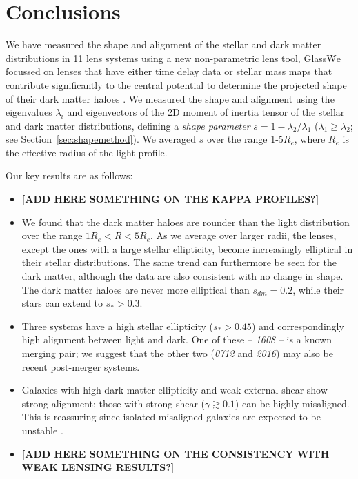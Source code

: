 \documentclass[useAMS,usenatbib]{mn2e}
\def\Glass{{\sc Glass}}
\begin{document}
\section{Conclusions}\label{sec:conclusions}
We have measured the shape and alignment of the stellar and dark matter distributions in 11 lens systems using a new non-parametric lens tool, \Glass\. We focussed on lenses that have either time delay data or stellar mass maps that contribute significantly to the central potential to determine the projected shape of their dark matter haloes \citep{2014MNRAS.445.2181C}. We measured the shape and alignment using the eigenvalues $\lambda_i$ and eigenvectors of the 2D moment of inertia tensor of the stellar and dark matter distributions, defining a {\it shape parameter} $s = 1 - \lambda_{2}/\lambda_{1}$ ($\lambda_{1} \geq \lambda_{2}$; see Section~\ref{sec:shapemethod}). We averaged $s$ over the range 1-5$R_e$, where $R_e$ is the effective radius of the light profile.

Our key results are as follows:

\begin{itemize}
\item \textbf{[ADD HERE SOMETHING ON THE KAPPA PROFILES?]}

\item We found that the dark matter haloes are rounder than the light distribution over the range $1R_e < R < 5R_e$. As we average over larger radii, the lenses, except the ones with a large stellar ellipticity, become increasingly elliptical in their stellar distributions. The same trend can furthermore be seen for the dark matter, although the data are also consistent with no change in shape. The dark matter haloes are never more elliptical than $s_{dm} = 0.2$, while their stars can extend to $s_* > 0.3$.

\item Three systems have a high stellar ellipticity ($s_* > 0.45$) and correspondingly high alignment between light and dark. One of these -- {\it1608} -- is a known merging pair; we suggest that the other two ({\it0712} and {\it2016}) may also be recent post-merger systems. 

\item Galaxies with high dark matter ellipticity and weak external shear show strong alignment; those with strong shear ($\gamma \gtrsim 0.1$) can be highly misaligned. This is reassuring since isolated misaligned galaxies are expected to be unstable \citep[e.g.][]{1979ApJ...233..872H,1988A&A...206..269M,2007ApJ...670.1027A,2015arXiv150203429D}.

\item \textbf{[ADD HERE SOMETHING ON THE CONSISTENCY WITH WEAK LENSING RESULTS?]}

\end{itemize}
\end{document}
